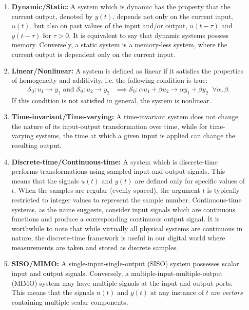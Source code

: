 \begin{enumerate}
\item \textbf{Dynamic/Static:} A system which is dynamic has the property that the current output, denoted by $y(t)$, depends not only on the current input, $u(t)$, but also on past values of the input and/or output, $u(t-\tau)$ and $y(t-\tau)$ for $\tau>0$. It is equivalent to say that dynamic systems possess memory. Conversely, a static system is a memory-less system, where the current output is dependent only on the current input.
\item \textbf{Linear/Nonlinear:} A system is defined as linear if it satisfies the properties of homogeneity and additivity, i.e. the following condition is true:
\begin{align}
\mathcal{S}_0: u_1 \rightarrow y_1 \text{ and } \mathcal{S}_0: u_2 \rightarrow y_2 &\implies \mathcal{S}_0: \alpha u_1+ \beta u_2 \rightarrow \alpha y_1+ \beta y_2 \; \; \forall \alpha, \beta.
\end{align}
If this condition is not satisfied in general, the system is nonlinear.
\item \textbf{Time-invariant/Time-varying:} A time-invariant system does not change the nature of its input-output transformation over time, while for time-varying systems, the time at which a given input is applied can change the resulting output. 
\item \textbf{Discrete-time/Continuous-time:} A system which is discrete-time performs transformations using sampled input and output signals. This means that the signals $u(t)$ and $y(t)$ are defined only for specific values of $t$. When the samples are regular (evenly spaced), the argument $t$ is typically restricted to integer values to represent the sample number. Continuous-time systems, as the name suggests, consider input signals which are continuous functions and produce a corresponding continuous output signal. It is worthwhile to note that while virtually all physical systems are continuous in nature, the discrete-time framework is useful in our digital world where measurements are taken and stored as discrete samples. 
\item \textbf{SISO/MIMO:} A single-input-single-output (SISO) system possesses scalar input and output signals. Conversely, a multiple-input-multiple-output (MIMO) system may have multiple signals at the input and output ports. This means that the signals $u(t)$ and $y(t)$ at any instance of $t$ are \emph{vectors} containing multiple scalar components.
\end{enumerate}

